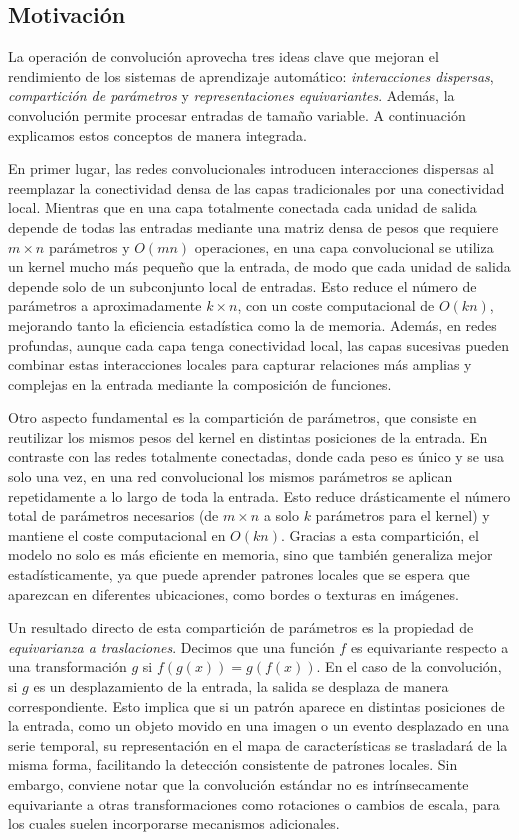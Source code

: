 \subsection{Motivación}

La operación de convolución aprovecha tres ideas clave que mejoran el rendimiento de los sistemas de aprendizaje automático: \textit{interacciones dispersas}, \textit{compartición de parámetros} y \textit{representaciones equivariantes}. Además, la convolución permite procesar entradas de tamaño variable. A continuación explicamos estos conceptos de manera integrada.

En primer lugar, las redes convolucionales introducen interacciones dispersas al reemplazar la conectividad densa de las capas tradicionales por una conectividad local. Mientras que en una capa totalmente conectada cada unidad de salida depende de todas las entradas mediante una matriz densa de pesos que requiere $m \times n$ parámetros y $O(mn)$ operaciones, en una capa convolucional se utiliza un kernel mucho más pequeño que la entrada, de modo que cada unidad de salida depende solo de un subconjunto local de entradas. Esto reduce el número de parámetros a aproximadamente $k \times n$, con un coste computacional de $O(kn)$, mejorando tanto la eficiencia estadística como la de memoria. Además, en redes profundas, aunque cada capa tenga conectividad local, las capas sucesivas pueden combinar estas interacciones locales para capturar relaciones más amplias y complejas en la entrada mediante la composición de funciones.

Otro aspecto fundamental es la compartición de parámetros, que consiste en reutilizar los mismos pesos del kernel en distintas posiciones de la entrada. En contraste con las redes totalmente conectadas, donde cada peso es único y se usa solo una vez, en una red convolucional los mismos parámetros se aplican repetidamente a lo largo de toda la entrada. Esto reduce drásticamente el número total de parámetros necesarios (de $m \times n$ a solo $k$ parámetros para el kernel) y mantiene el coste computacional en $O(kn)$. Gracias a esta compartición, el modelo no solo es más eficiente en memoria, sino que también generaliza mejor estadísticamente, ya que puede aprender patrones locales que se espera que aparezcan en diferentes ubicaciones, como bordes o texturas en imágenes.

Un resultado directo de esta compartición de parámetros es la propiedad de \emph{equivarianza a traslaciones}. Decimos que una función $f$ es equivariante respecto a una transformación $g$ si $f(g(x)) = g(f(x))$. En el caso de la convolución, si $g$ es un desplazamiento de la entrada, la salida se desplaza de manera correspondiente. Esto implica que si un patrón aparece en distintas posiciones de la entrada, como un objeto movido en una imagen o un evento desplazado en una serie temporal, su representación en el mapa de características se trasladará de la misma forma, facilitando la detección consistente de patrones locales. Sin embargo, conviene notar que la convolución estándar no es intrínsecamente equivariante a otras transformaciones como rotaciones o cambios de escala, para los cuales suelen incorporarse mecanismos adicionales.

